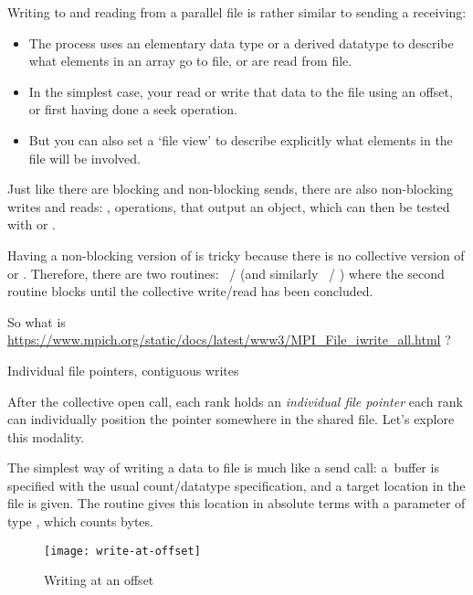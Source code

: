 Writing to and reading from a parallel file is rather similar to
sending a receiving:
\begin{itemize}
\item The process uses an elementary data type or a derived datatype
  to describe what elements in an array go to file, or are read from
  file.
\item In the simplest case, your read or write that data to the file using an
  offset, or first having done a seek operation.
\item But you can also set a `file view' to describe explicitly what
  elements in the file will be involved.
\end{itemize}

Just like there are blocking and non-blocking sends, there are also
non-blocking writes and reads:
,
operations, that output an  object,
which can then be tested with
 or .

Having a non-blocking version of
 is tricky because there is no collective version
of  or .
Therefore, there are two routines:
~/
(and similarly
~/
)
where the second routine blocks until the collective write/read
has been concluded.

\begin{remark}
  So what is
  \url{https://www.mpich.org/static/docs/latest/www3/MPI_File_iwrite_all.html}
  ?
\end{remark}

 {Individual file pointers, contiguous writes}
\label{sec:mpi-filepoint}

After the collective open call, each rank holds an
\emph{individual file pointer}
each rank can individually position the pointer somewhere in the shared file.
Let's explore this modality.

The simplest way of writing a data to file is much like a send call:
a~buffer is specified with the usual count/datatype specification,
and a target location in the file is given.
The routine  gives this location
in absolute terms with a parameter of type ,
which counts bytes.

\begin{figure}[ht]
  \label{fig:write-at}
  \caption{Writing at an offset}
  \texttt{[image: write-at-offset]}
\end{figure}

